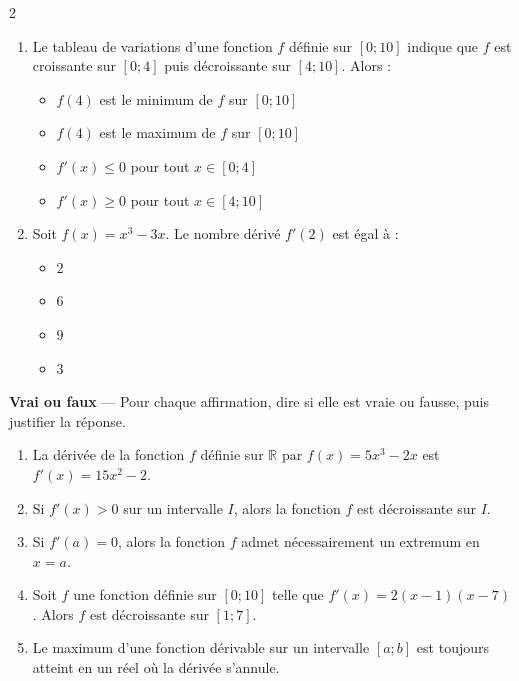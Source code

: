 \documentclass[10pt,a4paper]{article}
\begin{document}
\begin{multicols}{2}
\begin{exo}[][ccf]
\begin{enumerate}
\item Le tableau de variations d'une fonction $f$ définie sur $[0;10]$ indique que $f$ est croissante sur $[0;4]$ puis décroissante sur $[4;10]$. Alors :
\begin{itemize}
\item[\textbf{A.}] $f(4)$ est le minimum de $f$ sur $[0;10]$
\item[\textbf{B.}] $f(4)$ est le maximum de $f$ sur $[0;10]$
\item[\textbf{C.}] $f'(x) \leq 0$ pour tout $x \in [0;4]$
\item[\textbf{D.}] $f'(x) \geq 0$ pour tout $x \in [4;10]$
\end{itemize}

\item Soit $f(x) = x^3-3x$. Le nombre dérivé $f'(2)$ est égal à :
\begin{itemize}
\item[\textbf{A.}] $2$
\item[\textbf{B.}] $6$
\item[\textbf{C.}] $9$
\item[\textbf{D.}] $3$
\end{itemize}
\end{enumerate}

\end{exo}

\begin{exo}[][ccf]

\textbf{Vrai ou faux} --- Pour chaque affirmation, dire si elle est vraie ou fausse, puis justifier la réponse.

\begin{enumerate}
\item La dérivée de la fonction $f$ définie sur $\mathbb{R}$ par $f(x) = 5x^3-2x$ est $f'(x) = 15x^2-2$.

\item Si $f'(x) > 0$ sur un intervalle $I$, alors la fonction $f$ est décroissante sur $I$.

\item Si $f'(a) = 0$, alors la fonction $f$ admet nécessairement un extremum en $x=a$.

\item Soit $f$ une fonction définie sur $[0;10]$ telle que $f'(x) = 2(x-1)(x-7)$. Alors $f$ est décroissante sur $[1;7]$.

\item Le maximum d'une fonction dérivable sur un intervalle $[a;b]$ est toujours atteint en un réel où la dérivée s'annule.
\end{enumerate}

\end{exo}


\end{multicols}
\end{document}
